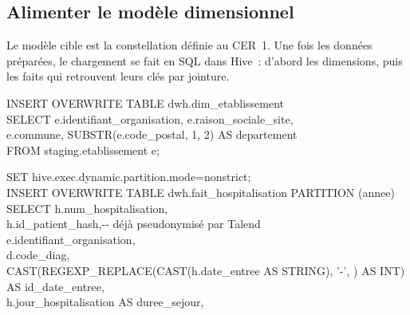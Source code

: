 \subsection{Alimenter le modèle dimensionnel}

\noindent Le modèle cible est la constellation définie au CER~1. Une fois les données préparées, le chargement se fait en SQL dans Hive~: d'abord les dimensions, puis les faits qui retrouvent leurs clés par jointure.

\begin{center}
\begin{minipage}{0.92\textwidth}
\begin{tcolorbox}[colback=title2!6,colframe=title1,title=\textbf{Dimension Établissement}~: une ligne par établissement,fonttitle=\small,boxsep=2pt]
\ttfamily\scriptsize
INSERT OVERWRITE TABLE dwh.dim\_etablissement\\
SELECT e.identifiant\_organisation, e.raison\_sociale\_site,\\
\hspace*{3.2em}e.commune, SUBSTR(e.code\_postal, 1, 2) AS departement\\
FROM staging.etablissement e;
\end{tcolorbox}
\begin{tcolorbox}[colback=title2!6,colframe=title1,title=\textbf{Fait Hospitalisation}~: clés des dimensions et mesures,fonttitle=\small,boxsep=2pt]
\ttfamily\scriptsize
SET hive.exec.dynamic.partition.mode=nonstrict;\\
INSERT OVERWRITE TABLE dwh.fait\_hospitalisation PARTITION (annee)\\
SELECT h.num\_hospitalisation,\\
\hspace*{3.2em}h.id\_patient\_hash,\hspace*{2em}-{}- déjà pseudonymisé par Talend\\
\hspace*{3.2em}e.identifiant\_organisation,\\
\hspace*{3.2em}d.code\_diag,\\
\hspace*{3.2em}CAST(REGEXP\_REPLACE(CAST(h.date\_entree AS STRING), '-', \textquotesingle\textquotesingle{}) AS INT)\\
\hspace*{6.4em}AS id\_date\_entree,\\
\hspace*{3.2em}h.jour\_hospitalisation AS duree\_sejour,\\

\end{tcolorbox}
\end{minipage}
\end{center}
